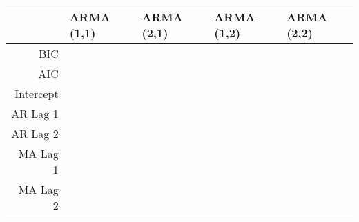 \begin{table}[ht]
\centering
\begin{tabular}{rllll}
  \hline
 & ARMA (1,1) & ARMA (2,1) & ARMA (1,2) & ARMA (2,2) \\ 
  \hline
BIC &  &  &  &  \\ 
  AIC &  &  &  &  \\ 
  Intercept &  &  &  &  \\ 
  AR Lag 1 &  &  &  &  \\ 
  AR Lag 2 &  &  &  &  \\ 
  MA Lag 1 &  &  &  &  \\ 
  MA Lag 2 &  &  &  &  \\ 
   \hline
\end{tabular}
\end{table}
